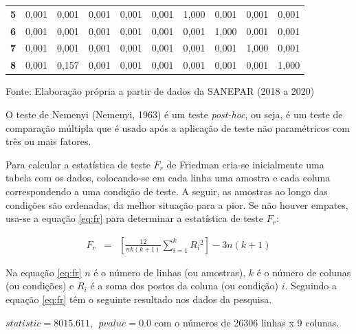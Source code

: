 \begin{table}[H]
\begin{tabular}{@{}clllllllll@{}}
		\textbf{5}                           & 0,001                          & 0,001                          & 0,001                          & 0,001                          & 0,001                          & 1,000                          & 0,001                          & 0,001                          & 0,001                          \\
		\textbf{6}                           & 0,001                          & 0,001                          & 0,001                          & 0,001                          & 0,001                          & 0,001                          & 1,000                          & 0,001                          & 0,001                          \\
		\textbf{7}                           & 0,001                          & 0,001                          & 0,001                          & 0,001                          & 0,001                          & 0,001                          & 0,001                          & 1,000                          & 0,001                          \\
		\textbf{8}                           & 0,001                          & 0,157                          & 0,001                          & 0,001                          & 0,001                          & 0,001                          & 0,001                          & 0,001                          & 1,000                          \\ \bottomrule
	\end{tabular}

Fonte: Elaboração própria a partir de dados da SANEPAR (2018 a 2020)
\end{table}

O teste de Nemenyi (Nemenyi, 1963) é um teste \textit{post-hoc}, ou seja, é um teste de comparação múltipla que é usado após a aplicação de teste não paramétricos com três ou mais fatores.
    
Para calcular a estatística de teste $F_r$ de Friedman cria-se inicialmente uma tabela com os dados, colocando-se em cada linha uma amostra e cada coluna correspondendo a uma condição de teste. A seguir, as amostras ao longo das condições são ordenadas, da melhor situação para a pior. Se não houver empates, usa-se a equação \eqref{eq:fr} para determinar a estatística de teste $F_r$:

\begin{eqnarray}
	F_r&=&\left[\frac{12}{n k(k+1)} \sum_{i=1}^k R_i{ }^2\right]-3 n(k+1)\label{eq:fr}
\end{eqnarray}
  
  Na equação \eqref{eq:fr} $n$ é o número de linhas (ou amostras), $k$ é o número de colunas (ou condições) e $R_i$ é a soma dos postos da coluna (ou condição) $i$.   
 Seguindo a equação \eqref{eq:fr} têm o seguinte resultado nos dados da pesquisa.
 
 $statistic=8015.611,\ \ pvalue=0.0$ com o números de 26306 linhas x 9 colunas.
    

    
